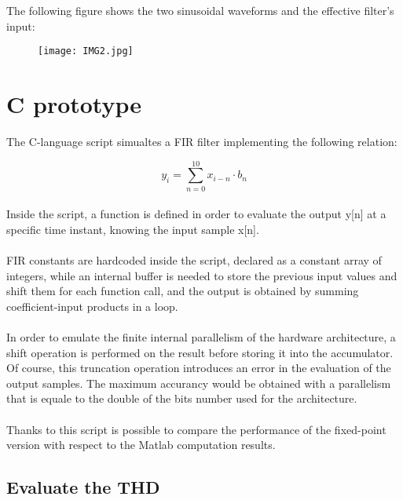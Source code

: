 The following figure shows the two sinusoidal waveforms and the effective filter's input:
\begin{figure}[!ht]
	\texttt{[image: IMG2.jpg]}
	\centering
\end{figure}


\section{C prototype}

The C-language script simualtes a FIR filter implementing the following  relation:

\begin{displaymath}[!h]
y_i = \sum_{n=0}^{10}{x_{i-n} \cdot b_n}
\end{displaymath}
\paragraph{}
Inside the script, a function is defined in order to evaluate the output y[n] at a specific time instant, knowing the input sample x[n].
\paragraph{}
FIR constants are hardcoded inside the script, declared as a constant array of integers, while an internal buffer is needed to store the previous input values and shift them for each function call, and the output is obtained by summing coefficient-input products in a loop.
\paragraph{}
In order to emulate the finite internal parallelism of the hardware architecture, a shift operation is performed on the result before storing it into the accumulator.
Of course, this truncation operation introduces an error in the evaluation of the output samples.
The maximum accurancy would be obtained with a parallelism that is equale to the double of the bits number used for the architecture.

\paragraph{}
Thanks to this script is possible to compare the performance of the fixed-point version with respect to 
the Matlab computation results.

\subsection{Evaluate the THD}

